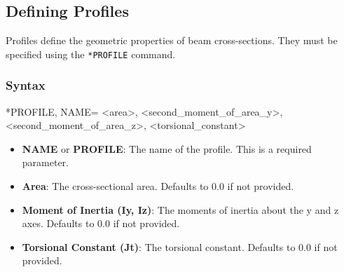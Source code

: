 \subsection{Defining Profiles}
Profiles define the geometric properties of beam cross-sections. They must be specified using the \texttt{*PROFILE} command.

\subsubsection{Syntax}
\begin{codeBlock}
*PROFILE, NAME=
<area>, <second_moment_of_area_y>, <second_moment_of_area_z>, <torsional_constant>
\end{codeBlock}

\begin{itemize}
\item \textbf{NAME} or \textbf{PROFILE}: The name of the profile. This is a required parameter.
\item \textbf{Area}: The cross-sectional area. Defaults to 0.0 if not provided.
\item \textbf{Moment of Inertia (Iy, Iz)}: The moments of inertia about the y and z axes. Defaults to 0.0 if not provided.
\item \textbf{Torsional Constant (Jt)}: The torsional constant. Defaults to 0.0 if not provided.
\end{itemize}




